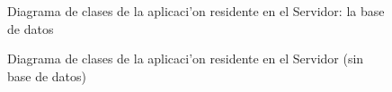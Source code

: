 \begin{figure}[h!]
	\begin{center}
     	\end{center}
    	\caption{Diagrama de clases de la aplicaci'on residente en el Servidor: la base de datos}
	\label{fig:dclasesServidor1}
\end{figure}

\pagebreak 

\begin{figure}[h!]
	\begin{center}
     	\end{center}
    	\caption{Diagrama de clases de la aplicaci'on residente en el Servidor (sin base de datos)}
	\label{fig:dclasesServidor2}
\end{figure}